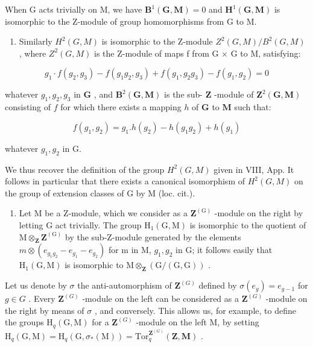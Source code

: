 When G acts trivially on M, we have \(\mathbf{B}^{1}(\mathbf{G},\mathbf{M})=0\) and \(\mathbf{H}^{1}(\mathbf{G},\mathbf{M})\) is isomorphic to the Z-module of group homomorphisms from G to M.

\begin{enumerate}
\def\labelenumi{\arabic{enumi})}
\setcounter{enumi}{2}
\tightlist
\item
  Similarly \(H^{2}(G, M)\) is isomorphic to the Z-module \(Z^{2}(G, M)/B^{2}(G, M)\) , where \(Z^{2}(G, M)\) is the Z-module of maps f from G × G to M, satisfying:
\end{enumerate}

\[
g _ {1} \cdot f (g _ {2}, g _ {3}) - f (g _ {1} g _ {2}, g _ {3}) + f (g _ {1}, g _ {2} g _ {3}) - f (g _ {1}, g _ {2}) = 0
\]

whatever \(g_{1}, g_{2}, g_{3}\) in \(\mathbf{G}\) , and \(\mathbf{B}^{2}(\mathbf{G}, \mathbf{M})\) is the sub- \(\mathbf{Z}\) -module of \(\mathbf{Z}^{2}(\mathbf{G}, \mathbf{M})\) consisting of \(f\) for which there exists a mapping \(h\) of \(\mathbf{G}\) to \(\mathbf{M}\) such that:

\[
f (g _ {1}, g _ {2}) = g _ {1}. h (g _ {2}) - h (g _ {1} g _ {2}) + h (g _ {1})
\]

whatever \(g_{1}, g_{2}\) in G.

We thus recover the definition of the group \(H^{2}(G, M)\) given in VIII, App. It follows in particular that there exists a canonical isomorphism of \(H^{2}(G, M)\) on the group of extension classes of G by M (loc. cit.).

\begin{enumerate}
\def\labelenumi{\arabic{enumi})}
\setcounter{enumi}{3}
\tightlist
\item
  Let M be a Z-module, which we consider as a \(\mathbf{Z}^{(\mathrm{G})}\) -module on the right by letting G act trivially. The group \(\mathrm{H}_{1}(\mathrm{G},\mathrm{M})\) is isomorphic to the quotient of \(\mathrm{M}\otimes_{\mathbf{Z}}\mathbf{Z}^{(\mathrm{G})}\) by the sub-Z-module generated by the elements \(m\otimes(e_{g_{1}g_{2}}-e_{g_{1}}-e_{g_{2}})\) for m in M, \(g_{1}, g_{2}\) in G; it follows easily that \(\mathrm{H}_{1}(\mathrm{G},\mathrm{M})\) is isomorphic to \(\mathrm{M}\otimes_{\mathbf{Z}}(\mathrm{G}/(\mathrm{G},\mathrm{G}))\) .
\end{enumerate}

Let us denote by \(\sigma\) the anti-automorphism of \(\mathbf{Z}^{(G)}\) defined by \(\sigma(e_g) = e_{g-1}\) for \(g \in G\) . Every \(\mathbf{Z}^{(G)}\) -module on the left can be considered as a \(\mathbf{Z}^{(G)}\) -module on the right by means of \(\sigma\) , and conversely. This allows us, for example, to define the groups \(\mathrm{H}_q(\mathrm{G}, \mathrm{M})\) for a \(\mathbf{Z}^{(G)}\) -module on the left M, by setting \(\mathrm{H}_q(\mathrm{G}, \mathrm{M}) = \mathrm{H}_q(\mathrm{G}, \sigma_*(\mathrm{M})) = \mathrm{Tor}_q^{\mathbf{Z}^{(G)}}(\mathbf{Z}, \mathbf{M})\) .

